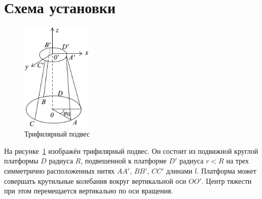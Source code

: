 \section{Схема установки}

\begin{figure}[h!]
	\begin{center}
		\includegraphics[width=0.3\textwidth]{pictures/PictureOne}
		\caption{Трифилярный подвес}\label{PicOne}
	\end{center}
\end{figure}
На рисунке~\ref{PicOne} изображён трифилярный подвес. Он состоит из подвижной круглой платформы $D$ радиуса $R$, подвешенной к платформе $D'$ радиуса $r<R$ на трех симметрично расположенных нитях $AA'$, $BB'$, $CC'$ длинами $l$. Платформа может совершать крутильные колебания вокруг вертикальной оси $OO'$. Центр тяжести при этом перемещается вертикально по оси вращения.